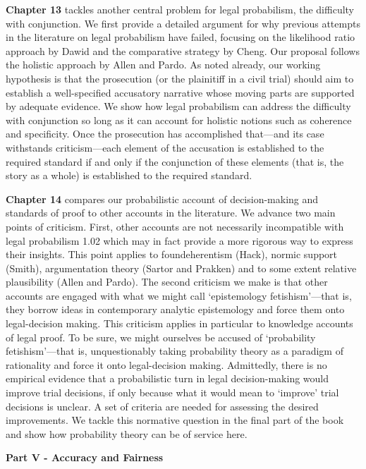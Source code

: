 \documentclass[
  10pt,
  dvipsnames,enabledeprecatedfontcommands]{scrartcl}
\begin{document}
\textbf{Chapter 13} tackles another central problem for legal
probabilism, the difficulty with conjunction. We first provide a
detailed argument for why previous attempts in the literature on legal
probabilism have failed, focusing on the likelihood ratio approach by
Dawid and the comparative strategy by Cheng. Our proposal follows the
holistic approach by Allen and Pardo. As noted already, our working
hypothesis is that the prosecution (or the plainitiff in a civil trial)
should aim to establish a well-specified accusatory narrative whose
moving parts are supported by adequate evidence. We show how legal
probabilism can address the difficulty with conjunction so long as it
can account for holistic notions such as coherence and specificity. Once
the prosecution has accomplished that---and its case withstands
criticism---each element of the accusation is established to the
required standard if and only if the conjunction of these elements (that
is, the story as a whole) is established to the required standard.

\textbf{Chapter 14} compares our probabilistic account of
decision-making and standards of proof to other accounts in the
literature. We advance two main points of criticism. First, other
accounts are not necessarily incompatible with legal probabilism 1.02
which may in fact provide a more rigorous way to express their insights.
This point applies to foundeherentism (Hack), normic support (Smith),
argumentation theory (Sartor and Prakken) and to some extent relative
plausibility (Allen and Pardo). The second criticism we make is that
other accounts are engaged with what we might call `epistemology
fetishism'---that is, they borrow ideas in contemporary analytic
epistemology and force them onto legal-decision making. This criticism
applies in particular to knowledge accounts of legal proof. To be sure,
we might ourselves be accused of `probability fetishism'---that is,
unquestionably taking probability theory as a paradigm of rationality
and force it onto legal-decision making. Admittedly, there is no
empirical evidence that a probabilistic turn in legal decision-making
would improve trial decisions, if only because what it would mean to
`improve' trial decisions is unclear. A set of criteria are needed for
assessing the desired improvements. We tackle this normative question in
the final part of the book and show how probability theory can be of
service here.

\vspace{3mm}

\noindent \textbf{Part V - Accuracy and Fairness}
\end{document}
